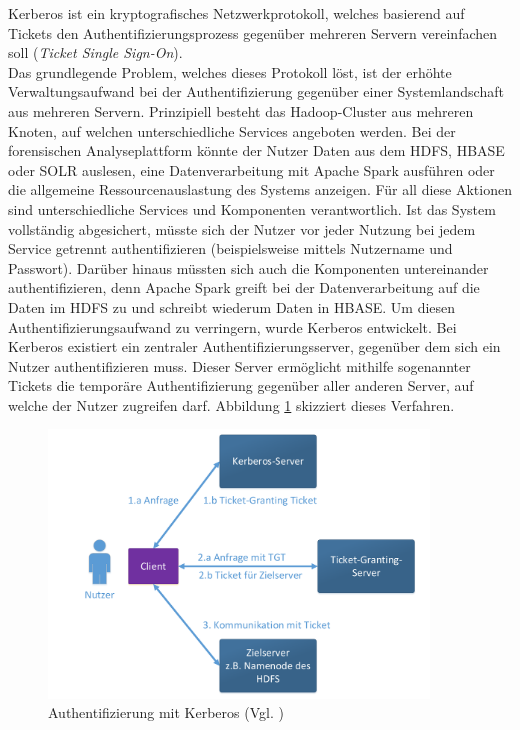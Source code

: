 \noindent
Kerberos ist ein kryptografisches Netzwerkprotokoll, welches basierend auf Tickets den Authentifizierungsprozess gegenüber mehreren Servern vereinfachen soll (\textit{Ticket Single Sign-On}).\cite[S. 425-429]{crypto}\\
Das grundlegende Problem, welches dieses Protokoll löst, ist der erhöhte Verwaltungsaufwand bei der Authentifizierung gegenüber einer Systemlandschaft aus mehreren Servern. Prinzipiell besteht das Hadoop-Cluster aus mehreren Knoten, auf welchen unterschiedliche Services angeboten werden. Bei der forensischen Analyseplattform könnte der Nutzer Daten aus dem HDFS, HBASE oder SOLR auslesen, eine Datenverarbeitung mit Apache Spark ausführen oder die allgemeine Ressourcenauslastung des Systems anzeigen. Für all diese Aktionen sind unterschiedliche Services und Komponenten verantwortlich. Ist das System vollständig abgesichert, müsste sich der Nutzer vor jeder Nutzung bei jedem Service getrennt authentifizieren (beispielsweise mittels Nutzername und Passwort). Darüber hinaus müssten sich auch die Komponenten untereinander authentifizieren, denn Apache Spark greift bei der Datenverarbeitung auf die Daten im HDFS zu und schreibt wiederum Daten in HBASE. Um diesen Authentifizierungsaufwand zu verringern, wurde Kerberos entwickelt. 
Bei Kerberos existiert ein zentraler Authentifizierungsserver, gegenüber dem sich ein Nutzer authentifizieren muss. Dieser Server ermöglicht mithilfe sogenannter Tickets die temporäre Authentifizierung gegenüber aller anderen Server, auf welche der Nutzer zugreifen darf.\cite[S. 425-429]{crypto} Abbildung \ref{fig:kerberos} skizziert dieses Verfahren. 
\begin{figure}[ht]
  \centering
  \includegraphics[width=0.9\textwidth]{./resource/kerberos_authentification.pdf}
  \caption{Authentifizierung mit Kerberos (Vgl. \cite[S.426]{crypto})}
  \label{fig:kerberos}
\end{figure}

